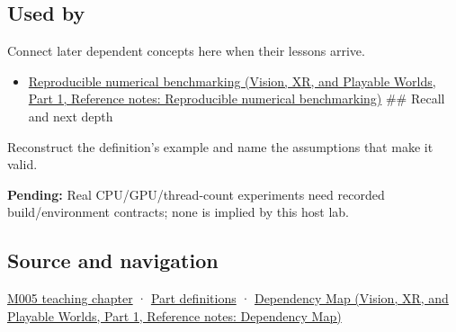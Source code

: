 \subsection{Used by}\label{appendix-5f1a2c3f97ff-used-by}

\hypertarget{appendix-5f1a2c3f97ff-used-by}{}

Connect later dependent concepts here when their lessons arrive.

\begin{itemize}
\tightlist
\item
  \href{../07-Vision-XR-and-Playable-Worlds-P01/main.pdf\#appendix-b9db93e28371}{Reproducible numerical benchmarking (Vision, XR, and Playable Worlds, Part 1, Reference notes: Reproducible numerical benchmarking)} \#\# Recall and next depth
\end{itemize}

Reconstruct the definition's example and name the assumptions that make it valid.

\textbf{Pending:} Real CPU/GPU/thread-count experiments need recorded build/environment contracts; none is implied by this host lab.

\subsection{Source and navigation}\label{appendix-5f1a2c3f97ff-source-and-navigation}

\hypertarget{appendix-5f1a2c3f97ff-source-and-navigation}{}

\hyperref[01-foundations-i-ch001-when-arithmetic-meets-uncertainty]{M005 teaching chapter} · \hyperref[appendix-fd090d982a15-m005---parts-77-88]{Part definitions} · \href{../07-Vision-XR-and-Playable-Worlds-P01/main.pdf\#appendix-4ad47bdd269a}{Dependency Map (Vision, XR, and Playable Worlds, Part 1, Reference notes: Dependency Map)}
